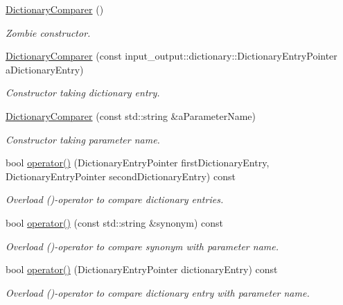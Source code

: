 \begin{DoxyCompactItemize}
\item 
\hyperlink{classtudat_1_1input__output_1_1dictionary_1_1DictionaryComparer_a8cb0e747f8ff243620d3d0f6b7a25971}{Dictionary\+Comparer} ()
\begin{DoxyCompactList}\small\item\em Zombie constructor. \end{DoxyCompactList}\item 
\hyperlink{classtudat_1_1input__output_1_1dictionary_1_1DictionaryComparer_a85948b9c9ac0a9393c587e097560ba29}{Dictionary\+Comparer} (const input\+\_\+output\+::dictionary\+::\+Dictionary\+Entry\+Pointer a\+Dictionary\+Entry)
\begin{DoxyCompactList}\small\item\em Constructor taking dictionary entry. \end{DoxyCompactList}\item 
\hyperlink{classtudat_1_1input__output_1_1dictionary_1_1DictionaryComparer_ae9ba9b6d73c7e035a625e325d23bfe95}{Dictionary\+Comparer} (const std\+::string \&a\+Parameter\+Name)
\begin{DoxyCompactList}\small\item\em Constructor taking parameter name. \end{DoxyCompactList}\item 
bool \hyperlink{classtudat_1_1input__output_1_1dictionary_1_1DictionaryComparer_a64463c274c8ad6eea9d10316cfe0fcfb}{operator()} (Dictionary\+Entry\+Pointer first\+Dictionary\+Entry, Dictionary\+Entry\+Pointer second\+Dictionary\+Entry) const 
\begin{DoxyCompactList}\small\item\em Overload ()-\/operator to compare dictionary entries. \end{DoxyCompactList}\item 
bool \hyperlink{classtudat_1_1input__output_1_1dictionary_1_1DictionaryComparer_a905b12eb09791e699d7649967442cf0e}{operator()} (const std\+::string \&synonym) const 
\begin{DoxyCompactList}\small\item\em Overload ()-\/operator to compare synonym with parameter name. \end{DoxyCompactList}\item 
bool \hyperlink{classtudat_1_1input__output_1_1dictionary_1_1DictionaryComparer_a1b0536cddc20359a16ae7ec2105b2109}{operator()} (Dictionary\+Entry\+Pointer dictionary\+Entry) const 
\begin{DoxyCompactList}\small\item\em Overload ()-\/operator to compare dictionary entry with parameter name. \end{DoxyCompactList}\item 

\end{DoxyCompactItemize}
